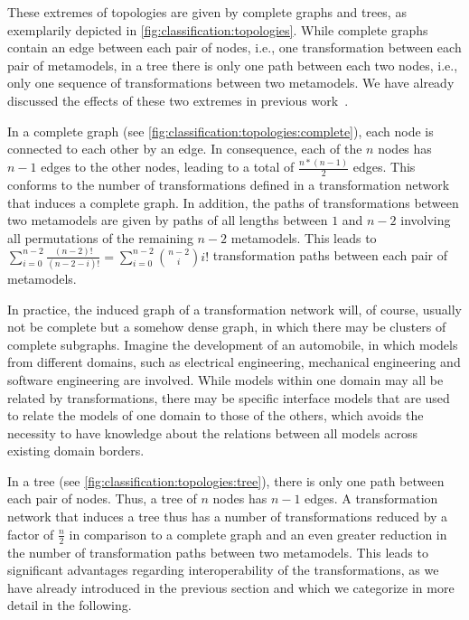 These extremes of topologies are given by complete graphs and trees, as exemplarily depicted in \autoref{fig:classification:topologies}.
While complete graphs contain an edge between each pair of nodes, i.e., one transformation between each pair of metamodels, in a tree there is only one path between each two nodes, i.e., only one sequence of transformations between two metamodels.
We have already discussed the effects of these two extremes in previous work~.

In a complete graph (see \autoref{fig:classification:topologies:complete}), each node is connected to each other by an edge.
In consequence, each of the $n$ nodes has $n-1$ edges to the other nodes, leading to a total of $\frac{n*(n-1)}{2}$ edges.
This conforms to the number of transformations defined in a transformation network that induces a complete graph.
In addition, the paths of transformations between two metamodels are given by paths of all lengths between $1$ and $n-2$ involving all permutations of the remaining $n-2$ metamodels.
This leads to $\sum_{i=0}^{n-2} \frac{(n-2)!}{(n-2-i)!} = \sum_{i=0}^{n-2} \binom{n-2}{i} i!$ transformation paths between each pair of metamodels.

In practice, the induced graph of a transformation network will, of course, usually not be complete but a somehow dense graph, in which there may be clusters of complete subgraphs.
Imagine the development of an automobile, in which models from different domains, such as electrical engineering, mechanical engineering and software engineering are involved. 
While models within one domain may all be related by transformations, there may be specific interface models that are used to relate the models of one domain to those of the others, which avoids the necessity to have knowledge about the relations between all models across existing domain borders.

In a tree (see \autoref{fig:classification:topologies:tree}), there is only one path between each pair of nodes.
Thus, a tree of $n$ nodes has $n-1$ edges.
A transformation network that induces a tree thus has a number of transformations reduced by a factor of $\frac{n}{2}$ in comparison to a complete graph and an even greater reduction in the number of transformation paths between two metamodels.
This leads to significant advantages regarding interoperability of the transformations, as we have already introduced in the previous section and which we categorize in more detail in the following.

